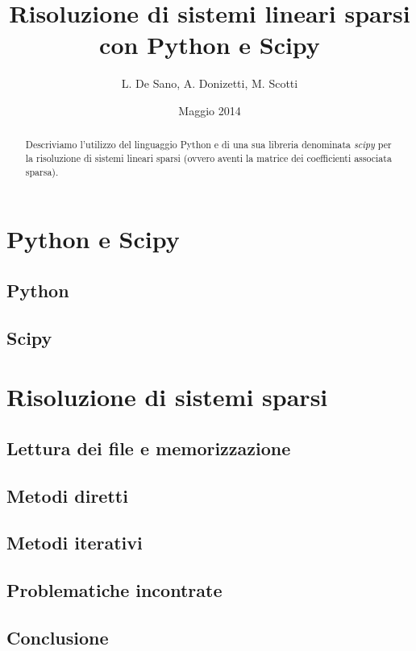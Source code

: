 \documentclass[11pt,a4paper]{scrartcl}
\author{L. De Sano, A. Donizetti, M. Scotti}
\title{Risoluzione di sistemi lineari sparsi \\con Python e Scipy}
\date{Maggio 2014}
\begin{document}
\maketitle
\begin{abstract}
Descriviamo l'utilizzo del linguaggio Python e di una sua libreria denominata \emph{scipy} per la risoluzione di sistemi lineari sparsi (ovvero aventi la matrice dei coefficienti associata sparsa).
\end{abstract}

\section*{Python e Scipy}

\subsection*{Python}

\subsection*{Scipy}


\section*{Risoluzione di sistemi sparsi}

\subsection*{Lettura dei file e memorizzazione}

\subsection*{Metodi diretti}

\subsection*{Metodi iterativi}

\subsection*{Problematiche incontrate}

\subsection*{Conclusione}
\end{document}
